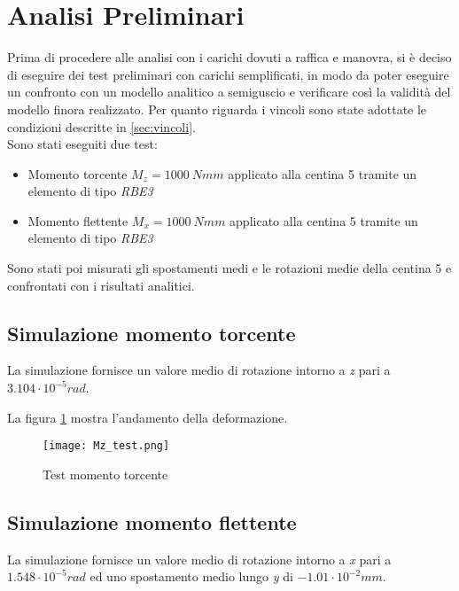 \documentclass[
10pt, %
a4paper, %
oneside, %
headinclude,footinclude, %
BCOR5mm, %
]{scrartcl}
\begin{document}
\newpage


\section{Analisi Preliminari}

Prima di procedere alle analisi con i carichi dovuti a raffica e manovra, si è deciso di eseguire dei test preliminari con carichi semplificati, in modo da poter eseguire un confronto con un modello analitico a semiguscio e verificare così la validità del modello finora realizzato. Per quanto riguarda i vincoli sono state adottate le condizioni descritte in \ref{sec:vincoli}.\\
Sono stati eseguiti due test:

\begin{itemize}
	\item Momento torcente $M_z = 1000 \ Nmm$ applicato alla centina 5 tramite un elemento di tipo \emph{RBE3}	
	\item Momento flettente $M_x = 1000 \ Nmm$ applicato alla centina 5 tramite un elemento di tipo \emph{RBE3}
\end{itemize}

Sono stati poi misurati gli spostamenti medi e le rotazioni medie della centina 5 e confrontati con i risultati analitici.

\subsection{Simulazione momento torcente}

La simulazione fornisce un valore medio di rotazione intorno a \emph{z} pari a $3.104\cdot 10^{-5} rad$.

La figura \ref{fig:Mztest} mostra l'andamento della deformazione.

\begin{figure}[tb]
	\centering 
	\texttt{[image: Mz\_test.png]} 
	\caption[Test Mz]{Test momento torcente} %
	\label{fig:Mztest} 
\end{figure}



\subsection{Simulazione momento flettente}

La simulazione fornisce un valore medio di rotazione intorno a \emph{x} pari a $1.548\cdot 10^{-5} rad$ ed uno spostamento medio lungo \emph{y} di $-1.01 \cdot 10^{-2}mm$.
\end{document}
